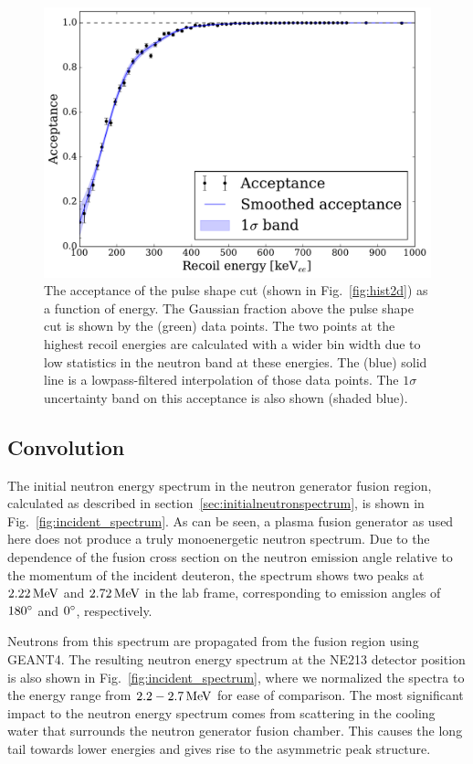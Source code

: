 \begin{figure}[!htbp]
\centering
    \includegraphics[width=\textwidth]{figures/ng/acceptance}
    \caption{The acceptance of the pulse shape cut (shown in Fig.~\ref{fig:hist2d}) as a function of energy. The Gaussian fraction above the pulse shape cut is shown by the (green) data points. The two points at the highest recoil energies are calculated with a wider bin width due to low statistics in the neutron band at these energies. The (blue) solid line is a lowpass-filtered interpolation of those data points. The $1\sigma$ uncertainty band on this acceptance is also shown (shaded blue).}
    \label{fig:acceptance}
\end{figure}

\subsection{Convolution}\label{sec:convolution}

The initial neutron energy spectrum in the neutron generator fusion region, calculated as described in section~\ref{sec:initialneutronspectrum}, is shown in Fig.~\ref{fig:incident_spectrum}. As can be seen, a plasma fusion generator as used here does not produce a truly monoenergetic neutron spectrum. Due to the dependence of the fusion cross section on the neutron emission angle relative to the momentum of the incident deuteron, the spectrum shows two peaks at $2.22\,\mathrm{MeV}$ and $2.72\,\mathrm{MeV}$ in the lab frame, corresponding to emission angles of $180{}^{\circ}$ and $0{}^{\circ}$, respectively.

Neutrons from this spectrum are propagated from the fusion region using GEANT4. The resulting neutron energy spectrum at the NE213 detector position is also shown in Fig.~\ref{fig:incident_spectrum}, where we normalized the spectra to the energy range from $2.2 - 2.7\,\mathrm{MeV}$ for ease of comparison. The most significant impact to the neutron energy spectrum comes from scattering in the cooling water that surrounds the neutron generator fusion chamber. This causes the long tail towards lower energies and gives rise to the asymmetric peak structure.

